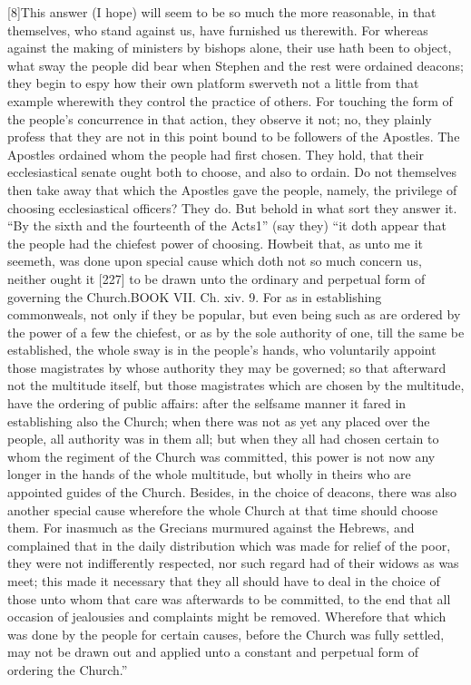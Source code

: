 [8]This answer (I hope) will seem to be so much the more reasonable, in that themselves, who stand against us, have furnished us therewith. For whereas against the making of ministers by bishops alone, their use hath been to object, what sway the people did bear when Stephen and the rest were ordained deacons; they begin to espy how their own platform swerveth not a little from that example wherewith they control the practice of others. For touching the form of the people’s concurrence in that action, they observe it not; no, they plainly profess that they are not in this point bound to be followers of the Apostles. The Apostles ordained whom the people had first chosen. They hold, that their ecclesiastical senate ought both to choose, and also to ordain. Do not themselves then take away that which the Apostles gave the people, namely, the privilege of choosing ecclesiastical officers? They do. But behold in what sort they answer it. “By the sixth and the fourteenth of the Acts1” (say they) “it doth appear that the people had the chiefest power of choosing. Howbeit that, as unto me it seemeth, was done upon special cause which doth not so much concern us, neither ought it [227] to be drawn unto the ordinary and perpetual form of governing the Church.BOOK VII. Ch. xiv. 9. For as in establishing commonweals, not only if they be popular, but even being such as are ordered by the power of a few the chiefest, or as by the sole authority of one, till the same be established, the whole sway is in the people’s hands, who voluntarily appoint those magistrates by whose authority they may be governed; so that afterward not the multitude itself, but those magistrates which are chosen by the multitude, have the ordering of public affairs: after the selfsame manner it fared in establishing also the Church; when there was not as yet any placed over the people, all authority was in them all; but when they all had chosen certain to whom the regiment of the Church was committed, this power is not now any longer in the hands of the whole multitude, but wholly in theirs who are appointed guides of the Church. Besides, in the choice of deacons, there was also another special cause wherefore the whole Church at that time should choose them. For inasmuch as the Grecians murmured against the Hebrews, and complained that in the daily distribution which was made for relief of the poor, they were not indifferently respected, nor such regard had of their widows as was meet; this made it necessary that they all should have to deal in the choice of those unto whom that care was afterwards to be committed, to the end that all occasion of jealousies and complaints might be removed. Wherefore that which was done by the people for certain causes, before the Church was fully settled, may not be drawn out and applied unto a constant and perpetual form of ordering the Church.”

